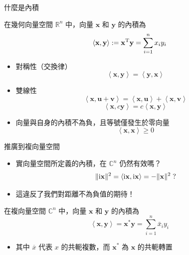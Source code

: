 \documentclass{beamer}
\begin{document}
\begin{CJK}{UTF8}{bsmi}
\begin{frame}{什麼是內積}
  \begin{definition}
    在幾何向量空間 $\mathbb R^n$ 中，向量 $\mathbf x$ 和 $\mathbf y$ 的內積為
    \[\left< \mathbf x, \mathbf y \right> := \mathbf x^{\textup T} \mathbf y = \sum_{i=1}^n x_i y_i\]
  \end{definition}
  \begin{itemize}
    \item 對稱性（交換律）
      \[\left< \mathbf x, \mathbf y \right> = \left< \mathbf y, \mathbf x \right>\]
    \item 雙線性
      \[\left< \mathbf x, \mathbf u + \mathbf v \right>
	  = \left< \mathbf x, \mathbf u \right> + \left< \mathbf x, \mathbf v \right>\]
      \[\left< \mathbf x, c \mathbf y \right> = c \left< \mathbf x, \mathbf y \right>\]
    \item 向量與自身的內積不為負，且等號僅發生於零向量
      \[\left< \mathbf x, \mathbf x \right> \ge 0\]
  \end{itemize}
\end{frame}

\begin{frame}{推廣到複向量空間}
  \begin{itemize}
    \item 實向量空間所定義的內積，在 $\mathbb C^n$ 仍然有效嗎？
      \[\Vert \textup i \mathbf x \Vert^2 = \left< \textup i \mathbf x, \textup i \mathbf x \right>
	  = - \Vert \mathbf x \Vert^2\; ?\]
    \item 這違反了我們對距離不為負值的期待！
  \end{itemize}
  \begin{definition}
    在複向量空間 $\mathbb C^n$ 中，向量 $\mathbf x$ 和 $\mathbf y$ 的內積為
    \[\left< \mathbf x, \mathbf y \right> = \mathbf x^* \mathbf y = \sum_{i=1}^n \bar x_i y_i\]
  \end{definition}
  \begin{itemize}
    \item 其中 $\overline x$ 代表 $x$ 的共軛複數，而 $\mathbf x^*$ 為 $\mathbf x$ 的共軛轉置
  \end{itemize}
\end{frame}


\end{CJK}
\end{document}
